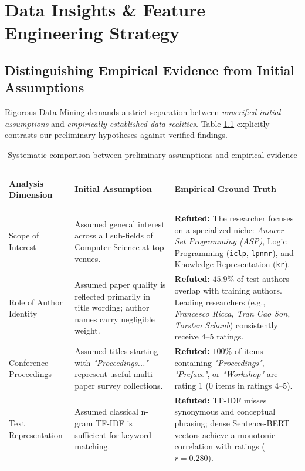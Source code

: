 \chapter{Data Insights \& Feature Engineering Strategy}
\label{chap:insights}

\section{Distinguishing Empirical Evidence from Initial Assumptions}
Rigorous Data Mining demands a strict separation between \textit{unverified initial assumptions} and \textit{empirically established data realities}. Table \ref{tab:assumptions_vs_observations} explicitly contrasts our preliminary hypotheses against verified findings.

\begin{table}[!htbp]
  \centering
  \small
  \begin{tabularx}{\linewidth}{>{\bfseries\raggedright\arraybackslash}p{4.0cm} >{\raggedright\arraybackslash}X >{\raggedright\arraybackslash}X}
    \toprule
    \rowcolor{PrismHeader}
    \color{PrismWhite}\textbf{Analysis Dimension} & 
    \color{PrismWhite}\textbf{Initial Assumption} & 
    \color{PrismWhite}\textbf{Empirical Ground Truth} \\
    \midrule
    Scope of Interest & Assumed general interest across all sub-fields of Computer Science at top venues. & \textbf{Refuted:} The researcher focuses on a specialized niche: \textit{Answer Set Programming (ASP)}, Logic Programming (\texttt{iclp}, \texttt{lpnmr}), and Knowledge Representation (\texttt{kr}). \\
    \rowcolor{PrismLabel}
    Role of Author Identity & Assumed paper quality is reflected primarily in title wording; author names carry negligible weight. & \textbf{Refuted:} $45.9\%$ of test authors overlap with training authors. Leading researchers (e.g., \textit{Francesco Ricca, Tran Cao Son, Torsten Schaub}) consistently receive 4--5 ratings. \\
    Conference Proceedings & Assumed titles starting with \textit{"Proceedings..."} represent useful multi-paper survey collections. & \textbf{Refuted:} $100\%$ of items containing \textit{"Proceedings"}, \textit{"Preface"}, or \textit{"Workshop"} are rating 1 ($0$ items in ratings 4--5). \\
    \rowcolor{PrismLabel}
    Text Representation & Assumed classical n-gram TF-IDF is sufficient for keyword matching. & \textbf{Refuted:} TF-IDF misses synonymous and conceptual phrasing; dense Sentence-BERT vectors achieve a monotonic correlation with ratings ($r = 0.280$). \\
    \bottomrule
  \end{tabularx}
  \caption{Systematic comparison between preliminary assumptions and empirical evidence}
  \label{tab:assumptions_vs_observations}
\end{table}

